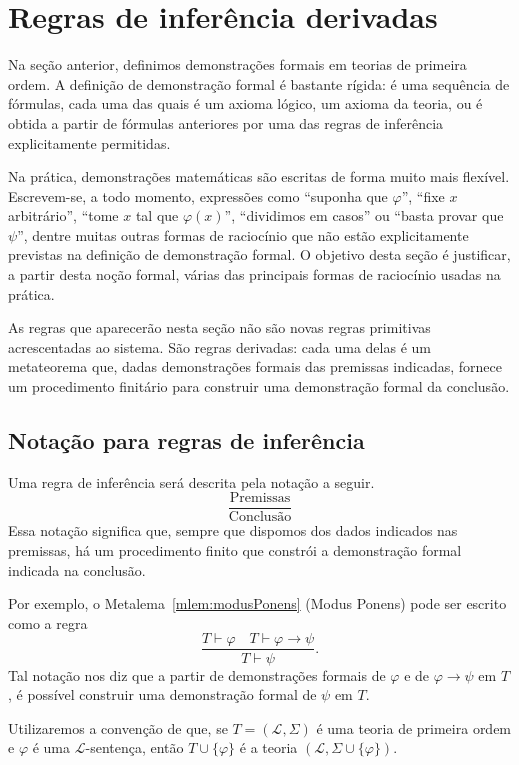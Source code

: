 \section{Regras de inferência derivadas}\label{sec:maisSobreDemonstracoesFormais}

Na seção anterior, definimos demonstrações formais em teorias de primeira ordem.
A definição de demonstração formal é bastante rígida: é uma sequência de fórmulas, cada uma das quais é um axioma lógico, um axioma da teoria, ou é obtida a partir de fórmulas anteriores por uma das regras de inferência explicitamente permitidas.

Na prática, demonstrações matemáticas são escritas de forma muito mais flexível.
Escrevem-se, a todo momento, expressões como ``suponha que $\varphi$'', ``fixe $x$ arbitrário'', ``tome $x$ tal que $\varphi(x)$'', ``dividimos em casos'' ou ``basta provar que $\psi$'', dentre muitas outras formas de raciocínio que não estão explicitamente previstas na definição de demonstração formal.
O objetivo desta seção é justificar, a partir desta noção formal, várias das principais formas de raciocínio usadas na prática.

As regras que aparecerão nesta seção não são novas regras primitivas acrescentadas ao sistema.
São regras derivadas: cada uma delas é um metateorema que, dadas demonstrações formais das premissas indicadas, fornece um procedimento finitário para construir uma demonstração formal da conclusão.

\subsection{Notação para regras de inferência}

Uma regra de inferência será descrita pela notação a seguir.
\[
    \frac{\text{Premissas}}{\text{Conclusão}}
\]
Essa notação significa que, sempre que dispomos dos dados indicados nas premissas, há um procedimento finito que constrói a demonstração formal indicada na conclusão.

Por exemplo, o Metalema~\ref{mlem:modusPonens} (Modus Ponens) pode ser escrito como a regra
\[
    \frac{T\vdash \varphi \quad T\vdash \varphi\rightarrow\psi}
         {T\vdash \psi}.
\]
Tal notação nos diz que a partir de demonstrações formais de $\varphi$ e de $\varphi\rightarrow\psi$ em $T$, é possível construir uma demonstração formal de $\psi$ em $T$.

Utilizaremos a convenção de que, se $T=(\mathcal L,\Sigma)$ é uma teoria de primeira ordem e $\varphi$ é uma $\mathcal L$-sentença, então $T\cup \{\varphi\}$ é a teoria $(\mathcal L,\Sigma\cup\{\varphi\})$.

